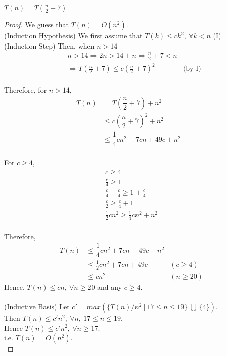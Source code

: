 \documentclass[12pt]{article}
\newenvironment{question}[2][Question]{\begin{trivlist}
\item[\hskip \labelsep {\bfseries #1}\hskip \labelsep {\bfseries #2.}]}{\end{trivlist}}
\begin{document}
\begin{question}{6} $T(n)  = T(\frac{n}{2} + 7)$
  \begin{proof}
    We guess that $T(n) = O(n^{2})$.\\
    (Induction Hypothesis) We first assume that $T(k) \leq ck^{2},\ \forall k < n$ (I).\\
    (Induction Step) Then, when $n > 14$
    \begin{align*}
      & n > 14 \Rightarrow 2n > 14 + n \Rightarrow \frac{n}{2} + 7 < n &\\
      & \Rightarrow T(\frac{n}{2} + 7) \leq c(\frac{n}{2} + 7)^{2} & \text{(by I)}\\
    \end{align*}

    Therefore, for $ n > 14$,
    \begin{align*}
      T(n) & = T(\dfrac{n}{2} + 7) + n^{2}               &\\
           & \leq c(\dfrac{n}{2} + 7)^{2} + n^{2}        &\\
           & \leq \dfrac{1}{4}cn^{2} + 7cn + 49c + n^{2} &\\
    \end{align*}

    For $c \geq 4$,
    \begin{align*}
      & c \geq 4           &\\
      & \frac{c}{4} \geq 1 &\\
      & \frac{c}{4} + \frac{c}{4} \geq 1 + \frac{c}{4} &\\
      & \frac{c}{2} \geq \frac{c}{4} + 1 &\\
      & \frac{1}{2}cn^{2} \geq \frac{1}{4}cn^{2} + n^{2} &\\
    \end{align*}

    Therefore,
    \begin{align*}
      T(n) & \leq \dfrac{1}{4}cn^{2} + 7cn + 49c + n^{2} &\\
           & \leq \frac{1}{2}cn^{2} + 7cn + 49c & (c \geq 4)\\
           & \leq cn^{2} & (n \geq 20)
    \end{align*}
    Hence, $T(n) \leq cn,\ \forall n \geq 20$ and any $c \geq 4$.\\ \\
    (Inductive Basis) Let $c' = max(\{T(n)/n^{2}\ |\ 17 \leq n \leq 19\}\ \bigcup\ \{4\})$.\\
    Then $T(n) \leq c'n^{2},\ \forall n,\ 17 \leq n \leq 19$.\\
    Hence $T(n) \leq c'n^{2},\ \forall n \geq 17$.\\
    i.e. $T(n) = O(n^{2})$.\\
  \end{proof}
\end{question}
\end{document}
